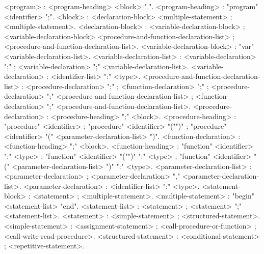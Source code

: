 	\begin{grammar}
		
		
		<program> : <program-heading> <block> ".".
		<program-heading> : "program" <identifier> ";".
		<block> : <declaration-block> <multiple-statement> ; <multiple-statement>.
		<declaration-block> : <variable-declaration-block> ; <variable-declaration-block> <procedure-and-function-declaration-list> ; <procedure-and-function-declaration-list>.
		<variable-declaration-block> : "var" <variable-declaration-list>.
		<variable-declaration-list> : <variable-declaration> ";" ; <variable-declaration> ";" <variable-declaration-list>.
		<variable-declaration> : <identifier-list> ":" <type>.
		<procedure-and-function-declaration-list> : <procedure-declaration> ";" ; <function-declaration> ";" ; <procedure-declaration> ";" <procedure-and-function-declaration-list> ; <function-declaration> ";" <procedure-and-function-declaration-list>.
		<procedure-declaration> : <procedure-heading> ";" <block>.
		<procedure-heading> : "procedure" <identifier> ; "procedure" <identifier> "("")" ; "procedure" <identifier> "(" <parameter-declaration-list> ")".
		<function-declaration> : <function-heading> ";" <block>.
		<function-heading> : "function" <identifier> ":" <type> ; "function" <identifier> "("")" ":" <type> ; "function" <identifier> "(" <parameter-declaration-list> ")" ":" <type>.
		<parameter-declaration-list> : <parameter-declaration> ; <parameter-declaration> "," <parameter-declaration-list>.
		<parameter-declaration> : <identifier-list> ":" <type>.
        <statement-block> : <statement> ; <multiple-statement>.
		<multiple-statement> : "begin" <statement-list> "end".
		<statement-list> : <statement> ; <statement> ";" <statement-list>.
		<statement> : <simple-statement> ; <structured-statement>.
		<simple-statement> : <assignment-statement> ; <call-procedure-or-function> ; <call-write-read-procedure>.
		<structured-statement> : <conditional-statement> ; <repetitive-statement>.

\end{grammar}
